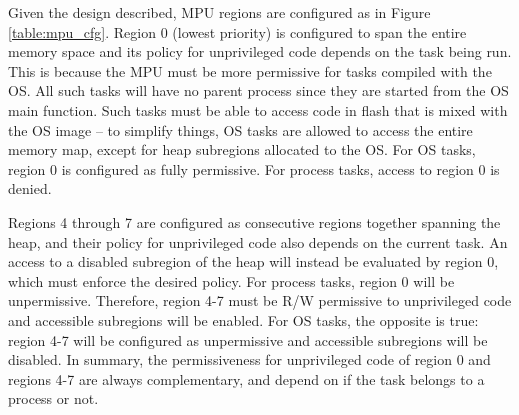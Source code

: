 Given the design described, MPU regions are configured as in Figure \ref{table:mpu_cfg}. Region 0 (lowest priority) is configured to span the entire memory space and its policy for unprivileged code depends on the task being run. This is because the MPU must be more permissive for tasks compiled with the OS. All such tasks will have no parent process since they are started from the OS main function. Such tasks must be able to access code in flash that is mixed with the OS image -- to simplify things, OS tasks are allowed to access the entire memory map, except for heap subregions allocated to the OS. For OS tasks, region 0 is configured as fully permissive. For process tasks, access to region 0 is denied.

Regions 4 through 7 are configured as consecutive regions together spanning the heap, and their policy for unprivileged code also depends on the current task. An access to a disabled subregion of the heap will instead be evaluated by region 0, which must enforce the desired policy. For process tasks, region 0 will be unpermissive. Therefore, region 4-7 must be R/W permissive to unprivileged code and accessible subregions will be enabled. For OS tasks, the opposite is true: region 4-7 will be configured as unpermissive and accessible subregions will be disabled. In summary, the permissiveness for unprivileged code of region 0 and regions 4-7 are always complementary, and depend on if the task belongs to a process or not.



